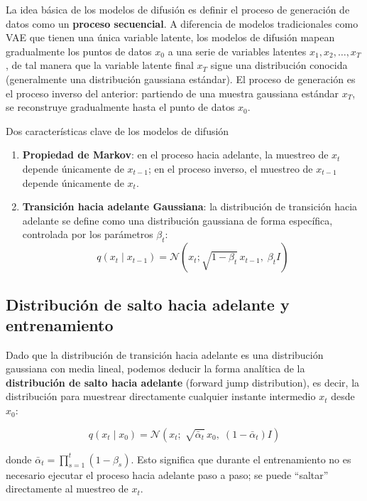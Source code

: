\documentclass[a4paper]{article}
\begin{document}
La idea básica de los modelos de difusión es definir el proceso de generación de datos como un \textbf{proceso secuencial}. A diferencia de modelos tradicionales como VAE que tienen una única variable latente, los modelos de difusión mapean gradualmente los puntos de datos $x_0$ a una serie de variables latentes $x_1, x_2, \ldots, x_T$, de tal manera que la variable latente final $x_T$ sigue una distribución conocida (generalmente una distribución gaussiana estándar). El proceso de generación es el proceso inverso del anterior: partiendo de una muestra gaussiana estándar $x_T$, se reconstruye gradualmente hasta el punto de datos $x_0$.

\begin{importantbox}{Dos características clave de los modelos de difusión}
\begin{enumerate}
    \item \textbf{Propiedad de Markov}: en el proceso hacia adelante, la muestreo de $x_t$ depende únicamente de $x_{t-1}$; en el proceso inverso, el muestreo de $x_{t-1}$ depende únicamente de $x_t$.
    \item \textbf{Transición hacia adelante Gaussiana}: la distribución de transición hacia adelante se define como una distribución gaussiana de forma específica, controlada por los parámetros $\beta_t$:
    $$q(x_t \mid x_{t-1}) = \mathcal{N}(x_t; \sqrt{1-\beta_t}\, x_{t-1},\; \beta_t I)$$
\end{enumerate}
\end{importantbox}

\subsection{Distribución de salto hacia adelante y entrenamiento}

Dado que la distribución de transición hacia adelante es una distribución gaussiana con media lineal, podemos deducir la forma analítica de la \textbf{distribución de salto hacia adelante} (forward jump distribution), es decir, la distribución para muestrear directamente cualquier instante intermedio $x_t$ desde $x_0$:

$$q(x_t \mid x_0) = \mathcal{N}(x_t;\; \sqrt{\bar{\alpha}_t}\, x_0,\; (1-\bar{\alpha}_t) I)$$

donde $\bar{\alpha}_t = \prod_{s=1}^{t}(1-\beta_s)$. Esto significa que durante el entrenamiento no es necesario ejecutar el proceso hacia adelante paso a paso; se puede ``saltar'' directamente al muestreo de $x_t$.
\end{document}
